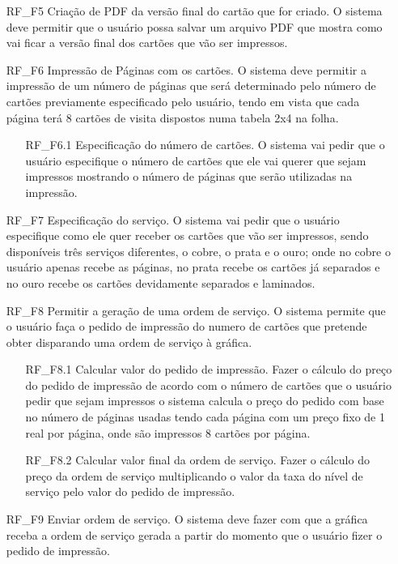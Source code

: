 \begin{itemize}
    \item[RF\_F5] Criação de PDF da versão final do cartão que for criado. O sistema deve permitir que o usuário possa salvar um arquivo PDF que mostra como vai ficar a versão final dos cartões que vão ser impressos.
    \item[RF\_F6] Impressão de Páginas com os cartões. O sistema deve permitir a impressão de um número de páginas que será determinado pelo número de cartões previamente especificado pelo usuário, tendo em vista que cada página terá 8 cartões de visita dispostos numa tabela 2x4 na folha.
    \begin{itemize}
        \item[RF\_F6.1] Especificação do número de cartões. O sistema vai pedir que o usuário especifique o número de cartões que ele vai querer que sejam impressos mostrando o número de páginas que serão utilizadas na impressão.
    \end{itemize}
    \item[RF\_F7] Especificação do serviço. O sistema vai pedir que o usuário especifique como ele quer receber os cartões que vão ser impressos, sendo disponíveis três serviços diferentes, o cobre, o prata e o ouro; onde no cobre o usuário apenas recebe as páginas, no prata recebe os cartões já separados e no ouro recebe os cartões devidamente separados e laminados.
    \item[RF\_F8] Permitir a geração de uma ordem de serviço. O sistema permite que o usuário faça o pedido de impressão do numero de cartões que pretende obter disparando uma ordem de serviço à gráfica.
    \begin{itemize}
        \item[RF\_F8.1] Calcular valor do pedido de impressão. Fazer o cálculo do preço do pedido de impressão de acordo com o número de cartões que o usuário pedir que sejam impressos o sistema calcula o preço do pedido com base no número de páginas usadas tendo cada página com um preço fixo de 1 real por página, onde são impressos 8 cartões por página.
        \item[RF\_F8.2] Calcular valor final da ordem de serviço. Fazer o cálculo do preço da ordem de serviço multiplicando o valor da taxa do nível de serviço pelo valor do pedido de impressão.
    \end{itemize}
    \item[RF\_F9] Enviar ordem de serviço. O sistema deve fazer com que a gráfica receba a ordem de serviço gerada a partir do momento que o usuário fizer o pedido de impressão.
\end{itemize}

